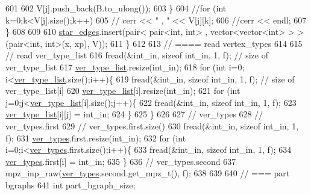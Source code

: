\begin{DoxyCode}
601 
602         V[j].push\_back(B.to\_ulong());
603       \}
604       \textcolor{comment}{//for (int k=0;k<V[j].size();k++)}
605       \textcolor{comment}{//  cerr << " , " << V[j][k];}
606       \textcolor{comment}{//cerr << endl;}
607     \}
608 
609 
610     \hyperlink{classmarked__graph__compressed_a7df5779d313486644132bd816937f532}{star\_edges}.insert(pair< pair<int, int> , vector<vector<int> > > (pair<int, int>(x, xp), V));
611   \}
612 
613   \textcolor{comment}{// ==== read vertex\_types}
614 
615   \textcolor{comment}{// read ver\_type\_list}
616   fread(&int\_in, \textcolor{keyword}{sizeof} int\_in, 1, f); \textcolor{comment}{// size of ver\_type\_list}
617   \hyperlink{classmarked__graph__compressed_af2e3e55223d436628a02758dfae88493}{ver\_type\_list}.resize(int\_in);
618   \textcolor{keywordflow}{for} (\textcolor{keywordtype}{int} i=0; i<\hyperlink{classmarked__graph__compressed_af2e3e55223d436628a02758dfae88493}{ver\_type\_list}.size();i++)\{
619     fread(&int\_in, \textcolor{keyword}{sizeof} int\_in, 1, f); \textcolor{comment}{// size of ver\_type\_list[i]}
620     \hyperlink{classmarked__graph__compressed_af2e3e55223d436628a02758dfae88493}{ver\_type\_list}[i].resize(int\_in);
621     \textcolor{keywordflow}{for} (\textcolor{keywordtype}{int} j=0;j<\hyperlink{classmarked__graph__compressed_af2e3e55223d436628a02758dfae88493}{ver\_type\_list}[i].size();j++)\{
622       fread(&int\_in, \textcolor{keyword}{sizeof} int\_in, 1, f);
623       \hyperlink{classmarked__graph__compressed_af2e3e55223d436628a02758dfae88493}{ver\_type\_list}[i][j] = int\_in;
624     \}
625   \}
626 
627   \textcolor{comment}{// ver\_types}
628   \textcolor{comment}{// ver\_types.first}
629   \textcolor{comment}{// ver\_types.first.size()}
630   fread(&int\_in, \textcolor{keyword}{sizeof} int\_in, 1, f);
631   \hyperlink{classmarked__graph__compressed_af446cc5e23c241a92b76642fd5ebc403}{ver\_types}.first.resize(int\_in);
632   \textcolor{keywordflow}{for} (\textcolor{keywordtype}{int} i=0;i<\hyperlink{classmarked__graph__compressed_af446cc5e23c241a92b76642fd5ebc403}{ver\_types}.first.size();i++)\{
633     fread(&int\_in, \textcolor{keyword}{sizeof} int\_in, 1, f);
634     \hyperlink{classmarked__graph__compressed_af446cc5e23c241a92b76642fd5ebc403}{ver\_types}.first[i] = int\_in;
635   \}
636   \textcolor{comment}{// ver\_types.second}
637   mpz\_inp\_raw(\hyperlink{classmarked__graph__compressed_af446cc5e23c241a92b76642fd5ebc403}{ver\_types}.second.get\_mpz\_t(), f);
638 
639 
640   \textcolor{comment}{// === part bgraphs}
641   \textcolor{keywordtype}{int} part\_bgraph\_size;

\end{DoxyCode}

